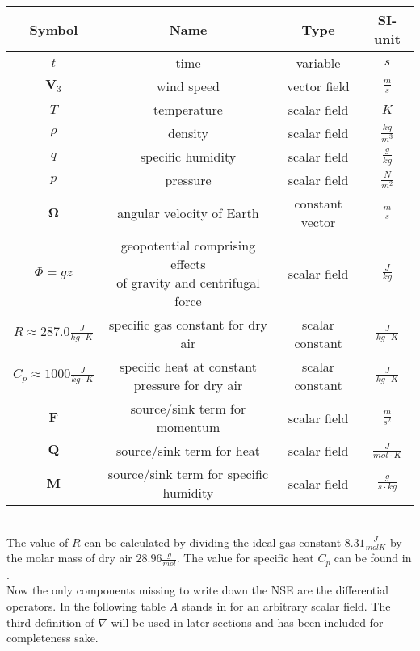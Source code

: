 \begin{tabular}{c|c|c|c}
\hline
Symbol & Name & Type & SI-unit \\ 
\hline 
$t$ & time & variable & $s$ \\
\hline 
$\textbf{V}_3$ & wind speed & vector field & $\frac{m}{s}$ \\
\hline 
$T$ & temperature & scalar field & $K$ \\
\hline 
$\rho$ & density & scalar field & $\frac{kg}{m^3}$ \\
\hline 
$q$ & specific humidity & scalar field & $\frac{g}{kg}$ \\
\hline 
$p$ & pressure & scalar field & $\frac{N}{m^2}$ \\
\hline 
$\boldsymbol{\Omega}$ & angular velocity of Earth & constant vector & $\frac{m}{s}$ \\
\hline 
$\Phi = gz$ & \makecell{geopotential comprising effects\\ of gravity and centrifugal force} & scalar field & $\frac{J}{kg}$ \\
\hline 
$R \approx 287.0 \frac{J}{kg\cdot K}$ & specific gas constant for dry air & scalar constant & $\frac{J}{kg\cdot K}$ \\ 
\hline 
$C_p \approx 1000 \frac{J}{kg\cdot K}$ & \makecell{specific heat at constant \\pressure for dry air} & scalar constant & $\frac{J}{kg\cdot K}$ \\ 
\hline 
$\textbf{F}$ & source/sink term for momentum & scalar field & $\frac{m}{s^2}$ \\ 
\hline 
$\textbf{Q}$ & source/sink term for heat & scalar field & $\frac{J}{mol\cdot K}$ \\ 
\hline 
$\textbf{M}$ & source/sink term for specific humidity & scalar field & $\frac{g}{s\cdot kg}$ \\ 
\end{tabular}
\\
The value of $R$ can be calculated by dividing the ideal gas constant $8.31\frac{J}{mol K}$\cite{mohr2008codata} by the molar mass of dry air $28.96\frac{g}{mol}$\cite{langeheinecke1993thermodynamik}.
The value for specific heat $C_p$ can be found in \cite{beckett1955tables}.
\\

Now the only components missing to write down the NSE are the differential operators.
In the following table $A$ stands in for an arbitrary scalar field.
The third definition of $\nabla$ will be used in later sections and has been included for completeness sake.

